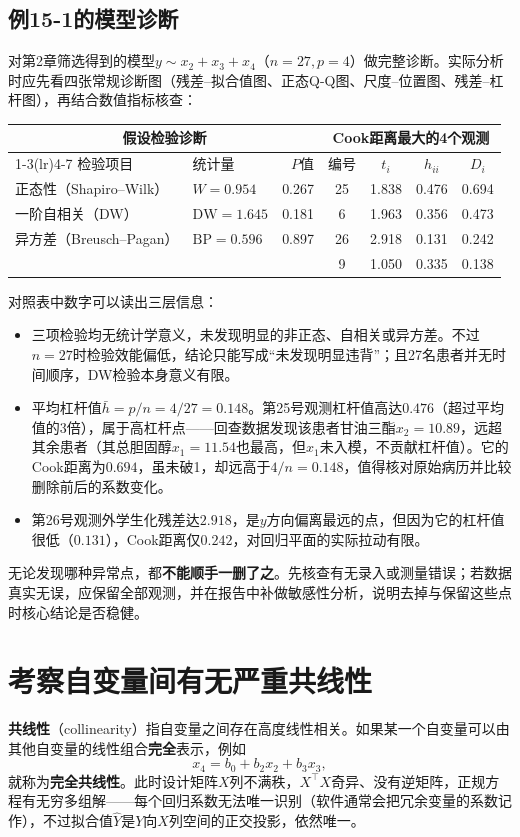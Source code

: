 \subsection{例15-1的模型诊断}
对第2章筛选得到的模型$y\sim x_2+x_3+x_4$（$n=27,p=4$）做完整诊断。实际分析时应先看四张常规诊断图（残差--拟合值图、正态Q-Q图、尺度--位置图、残差--杠杆图），再结合数值指标核查：
\begin{center}\small
\begin{tabular}{llr@{\qquad}cccc}
\toprule \multicolumn{3}{c}{假设检验诊断}&\multicolumn{4}{c}{Cook距离最大的4个观测}\\\cmidrule(lr){1-3}\cmidrule(lr){4-7}
检验项目&统计量&$P$值&编号&$t_i$&$h_{ii}$&$D_i$\\\midrule
正态性（Shapiro--Wilk）&$W=0.954$&0.267&25&1.838&0.476&0.694\\
一阶自相关（DW）&$\mathrm{DW}=1.645$&0.181&6&1.963&0.356&0.473\\
异方差（Breusch--Pagan）&$\mathrm{BP}=0.596$&0.897&26&2.918&0.131&0.242\\
&&&9&1.050&0.335&0.138\\\bottomrule
\end{tabular}
\end{center}
对照表中数字可以读出三层信息：
\begin{itemize}
\item 三项检验均无统计学意义，未发现明显的非正态、自相关或异方差。不过$n=27$时检验效能偏低，结论只能写成“未发现明显违背”；且27名患者并无时间顺序，DW检验本身意义有限。
\item 平均杠杆值$\bar h=p/n=4/27=0.148$。第25号观测杠杆值高达$0.476$（超过平均值的3倍），属于高杠杆点——回查数据发现该患者甘油三酯$x_2=10.89$，远超其余患者（其总胆固醇$x_1=11.54$也最高，但$x_1$未入模，不贡献杠杆值）。它的Cook距离为$0.694$，虽未破1，却远高于$4/n=0.148$，值得核对原始病历并比较删除前后的系数变化。
\item 第26号观测外学生化残差达$2.918$，是$y$方向偏离最远的点，但因为它的杠杆值很低（$0.131$），Cook距离仅$0.242$，对回归平面的实际拉动有限。
\end{itemize}
无论发现哪种异常点，都\textbf{不能顺手一删了之}。先核查有无录入或测量错误；若数据真实无误，应保留全部观测，并在报告中补做敏感性分析，说明去掉与保留这些点时核心结论是否稳健。

\section{考察自变量间有无严重共线性}
\textbf{共线性}（collinearity）指自变量之间存在高度线性相关。如果某一个自变量可以由其他自变量的线性组合\textbf{完全}表示，例如
\[
x_4=b_0+b_2x_2+b_3x_3,
\]
就称为\textbf{完全共线性}。此时设计矩阵$X$列不满秩，$X^\top X$奇异、没有逆矩阵，正规方程有无穷多组解——每个回归系数无法唯一识别（软件通常会把冗余变量的系数记作），不过拟合值$\widehat Y$是$Y$向$X$列空间的正交投影，依然唯一。

